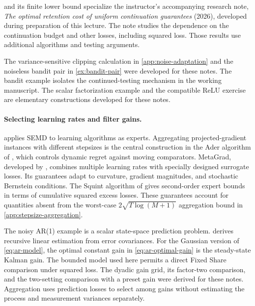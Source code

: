 \documentclass[11pt,twoside]{article}
\theoremstyle{definition}
\theoremstyle{remark}
\begin{document}
 and its finite lower bound specialize the
instructor's accompanying research note, \emph{The optimal retention cost
of uniform continuation guarantees} (2026), developed during preparation
of this lecture. The note studies the dependence on the continuation budget
and other losses, including
squared loss. Those results use additional algorithms and testing arguments.

The variance-sensitive clipping calculation in
\cref{app:noise-adaptation} and the noiseless bandit pair in
\cref{ex:bandit-pair} were developed for these notes. The bandit example
isolates the continued-testing mechanism in the working manuscript.
The scalar factorization example and the compatible ReLU exercise are
elementary constructions developed for these notes.

\paragraph{Selecting learning rates and filter gains.}
 applies SEMD to learning algorithms as
experts. Aggregating projected-gradient instances with different stepsizes
is the central construction in the Ader algorithm of \citet{zhang2018},
which controls dynamic regret against moving comparators.
MetaGrad, developed by \citet{vanerven2021}, combines multiple learning
rates with specially designed surrogate losses. Its guarantees adapt to
curvature, gradient magnitudes, and stochastic Bernstein conditions.
The Squint algorithm of \citet{koolen2015} gives second-order expert bounds
in terms of cumulative squared excess losses. These guarantees account
for quantities absent from the worst-case $2\sqrt{T\log(M+1)}$
aggregation bound in \cref{app:stepsize-aggregation}.

The noisy AR(1) example is a scalar state-space prediction problem.
\citet{kalman1960} derives recursive linear estimation from error
covariances. For the Gaussian version of \cref{eq:ar-model}, the optimal
constant gain in \cref{eq:ar-optimal-gain} is the steady-state Kalman
gain. The bounded model used here permits a direct Fixed Share comparison
under squared loss. The dyadic gain grid, its factor-two comparison, and
the two-setting comparison with a preset gain were derived for these notes.
Aggregation uses prediction
losses to select among gains without estimating the process and measurement
variances separately.
\end{document}
